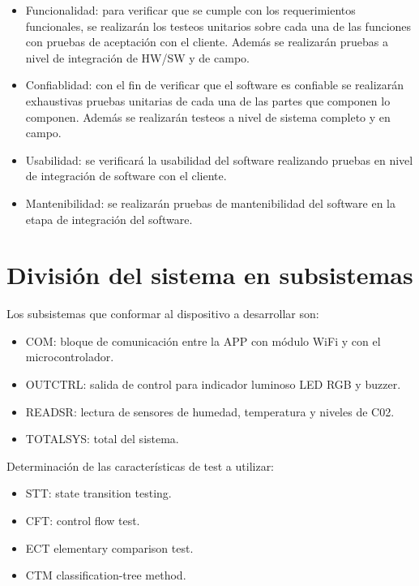 \documentclass[11pt]{article}
\begin{document}
\begin{itemize}
    \item Funcionalidad: para verificar que se cumple con los requerimientos
          funcionales, se realizarán los testeos unitarios sobre cada una de las
          funciones con pruebas de aceptación con el cliente. Además se realizarán
          pruebas a nivel de integración de HW/SW y de campo.
    \item Confiablidad: con el fin de verificar que el software es confiable se
          realizarán exhaustivas pruebas unitarias de cada una de las partes que componen
          lo componen. Además se realizarán testeos a nivel de sistema completo y en
          campo.
    \item Usabilidad: se verificará la usabilidad del software realizando pruebas
          en nivel de integración de software con el cliente.
    \item Mantenibilidad: se realizarán pruebas de mantenibilidad del software en
          la etapa de integración del software.
\end{itemize}

\section{División del sistema en subsistemas}

Los subsistemas que conformar al dispositivo a desarrollar son:
\begin{itemize}
    \item COM: bloque de comunicación entre la APP con módulo WiFi y con el
          microcontrolador.
    \item OUTCTRL: salida de control para indicador luminoso LED RGB y buzzer.
    \item READSR: lectura de sensores de humedad, temperatura y niveles de C02.
    \item TOTALSYS: total del sistema.
\end{itemize}

Determinación de las características de test a utilizar:
\begin{itemize}
    \item STT: state transition testing.
    \item CFT: control flow test.
    \item ECT elementary comparison test.
    \item CTM classification-tree method.
\end{itemize}
\end{document}
